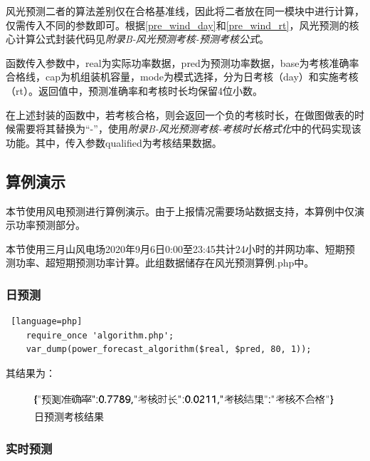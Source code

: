\documentclass[winfonts,UTF8,a4paper]{ctexart}
\begin{document}
风光预测二者的算法差别仅在合格基准线，因此将二者放在同一模块中进行计算，仅需传入不同的参数即可。根据\ref{pre_wind_day}和\ref{pre_wind_rt}，风光预测的核心计算公式封装代码见\textit{附录B-风光预测考核-预测考核公式}。

函数传入参数中，real为实际功率数据，pred为预测功率数据，base为考核准确率合格线，cap为机组装机容量，mode为模式选择，分为日考核（day）和实施考核（rt）。返回值中，预测准确率和考核时长均保留4位小数。

在上述封装的函数中，若考核合格，则会返回一个负的考核时长，在做图做表的时候需要将其替换为“-”，使用\textit{附录B-风光预测考核-考核时长格式化}中的代码实现该功能。其中，传入参数qualified为考核结果数据。


\subsection{算例演示}
本节使用风电预测进行算例演示。由于上报情况需要场站数据支持，本算例中仅演示功率预测部分。

本节使用三月山风电场2020年9月6日0:00至23:45共计24小时的并网功率、短期预测功率、超短期预测功率计算。此组数据储存在风光预测算例.php中。

\subsubsection{日预测}

\begin{lstlisting} [language=php]
	require_once 'algorithm.php';
	var_dump(power_forecast_algorithm($real, $pred, 80, 1));
\end{lstlisting}

其结果为：
\begin{figure}[H]
	\centering
	\includegraphics[width=0.7\linewidth]{pic/screenshot008}
	\caption{日预测考核结果}
	\label{fig:screenshot008}
\end{figure}



\subsubsection{实时预测}
\end{document}
